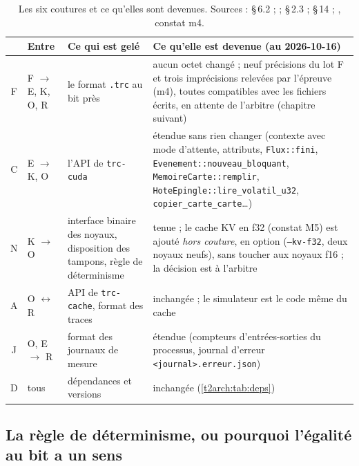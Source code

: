 \begin{table}[ht]
\centering\small
\begin{tabularx}{\linewidth}{c l >{\raggedright\arraybackslash}X >{\raggedright\arraybackslash}X}
\toprule
& Entre & Ce qui est gelé & Ce qu'elle est devenue (au 2026-10-16) \\
\midrule
F & F $\to$ E, K, O, R & le format \texttt{.trc} au bit près & aucun octet changé ; neuf précisions du lot F et trois imprécisions relevées par l'épreuve (m4), toutes compatibles avec les fichiers écrits, en attente de l'arbitre (chapitre suivant) \\
C & E $\to$ K, O & l'API de \texttt{trc-cuda} & étendue sans rien changer (contexte avec mode d'attente, attributs, \texttt{Flux::fini}, \texttt{Evenement::nouveau\_bloquant}, \texttt{MemoireCarte::remplir}, \texttt{HoteEpingle::\allowbreak lire\_volatil\_u32}, \texttt{copier\_carte\_carte}…) \\
N & K $\to$ O & interface binaire des noyaux, disposition des tampons, règle de déterminisme & tenue ; le cache KV en f32 (constat M5) est ajouté \emph{hors couture}, en option (\texttt{--kv-f32}, deux noyaux neufs), sans toucher aux noyaux f16 ; la décision est à l'arbitre \\
A & O $\leftrightarrow$ R & API de \texttt{trc-cache}, format des traces & inchangée ; le simulateur est le code même du cache \\
J & O, E $\to$ R & format des journaux de mesure & étendue (compteurs d'entrées-sorties du processus, journal d'erreur \texttt{<journal>.erreur.json}) \\
D & tous & dépendances et versions & inchangée (\cref{t2arch:tab:deps}) \\
\bottomrule
\end{tabularx}
\caption[Les coutures et leur histoire]{Les six coutures et ce qu'elles sont devenues. Sources :  §\,6.2 ;  ;  §\,2.3 ;  §\,14 ; , constat m4.}
\label{t2arch:tab:coutures}
\end{table}

\subsection{La règle de déterminisme, ou pourquoi l'égalité au bit a un sens}

